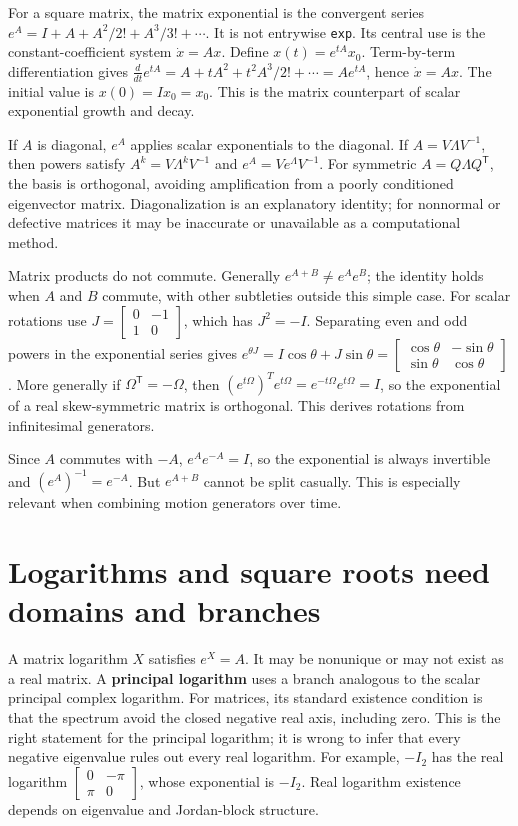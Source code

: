 For a square matrix, the matrix exponential is the convergent series \(e^A=I+A+A^2/2!+A^3/3!+\cdots\). It is not entrywise \texttt{exp}. Its central use is the constant-coefficient system \(\dot x=Ax\). Define \(x(t)=e^{tA}x_0\). Term-by-term differentiation gives \(\frac{d}{dt}e^{tA}=A+ tA^2+t^2A^3/2!+\cdots=Ae^{tA}\), hence \(\dot x=Ax\). The initial value is \(x(0)=Ix_0=x_0\). This is the matrix counterpart of scalar exponential growth and decay.

If \(A\) is diagonal, \(e^A\) applies scalar exponentials to the diagonal. If \(A=V\Lambda V^{-1}\), then powers satisfy \(A^k=V\Lambda^kV^{-1}\) and \(e^A=Ve^\Lambda V^{-1}\). For symmetric \(A=Q\Lambda Q^\mathsf T\), the basis is orthogonal, avoiding amplification from a poorly conditioned eigenvector matrix. Diagonalization is an explanatory identity; for nonnormal or defective matrices it may be inaccurate or unavailable as a computational method.

Matrix products do not commute. Generally \(e^{A+B}\ne e^Ae^B\); the identity holds when \(A\) and \(B\) commute, with other subtleties outside this simple case. For scalar rotations use \(J=\begin{bmatrix}0&-1\\1&0\end{bmatrix}\), which has \(J^2=-I\). Separating even and odd powers in the exponential series gives \(e^{\theta J}=I\cos\theta+J\sin\theta=\begin{bmatrix}\cos\theta&-\sin\theta\\\sin\theta&\cos\theta\end{bmatrix}\). More generally if \(\Omega^\mathsf T=-\Omega\), then \((e^{t\Omega})^Te^{t\Omega}=e^{-t\Omega}e^{t\Omega}=I\), so the exponential of a real skew-symmetric matrix is orthogonal. This derives rotations from infinitesimal generators.

Since \(A\) commutes with \(-A\), \(e^Ae^{-A}=I\), so the exponential is always invertible and \((e^A)^{-1}=e^{-A}\). But \(e^{A+B}\) cannot be split casually. This is especially relevant when combining motion generators over time.

\section{Logarithms and square roots need domains and branches}\label{02-foundations-ii-ch026-logarithms-and-square-roots-need-domains-and-branches}

A matrix logarithm \(X\) satisfies \(e^X=A\). It may be nonunique or may not exist as a real matrix. A \textbf{principal logarithm} uses a branch analogous to the scalar principal complex logarithm. For matrices, its standard existence condition is that the spectrum avoid the closed negative real axis, including zero. This is the right statement for the principal logarithm; it is wrong to infer that every negative eigenvalue rules out every real logarithm. For example, \(-I_2\) has the real logarithm \(\begin{bmatrix}0&-\pi\\\pi&0\end{bmatrix}\), whose exponential is \(-I_2\). Real logarithm existence depends on eigenvalue and Jordan-block structure.

